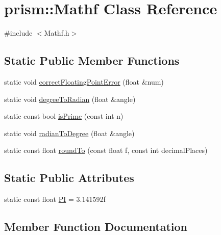 \hypertarget{classprism_1_1_mathf}{}\section{prism\+:\+:Mathf Class Reference}
\label{classprism_1_1_mathf}


{\ttfamily \#include $<$Mathf.\+h$>$}

\subsection*{Static Public Member Functions}
\begin{DoxyCompactItemize}
\item 
static void \hyperlink{classprism_1_1_mathf_ad97b3775f919367abc7ad8726ecd97d2}{correct\+Floating\+Point\+Error} (float \&num)
\item 
static void \hyperlink{classprism_1_1_mathf_ac72a5e8e138a66e62f191215468e394f}{degree\+To\+Radian} (float \&angle)
\item 
static const bool \hyperlink{classprism_1_1_mathf_a7546312788a409407af539770350f5e3}{is\+Prime} (const int n)
\item 
static void \hyperlink{classprism_1_1_mathf_aba90ed9091b83cca1567aee6c4acf13a}{radian\+To\+Degree} (float \&angle)
\item 
static const float \hyperlink{classprism_1_1_mathf_a6ab6c3867985cc8e0df9717ed0a00749}{round\+To} (const float f, const int decimal\+Places)
\end{DoxyCompactItemize}
\subsection*{Static Public Attributes}
\begin{DoxyCompactItemize}
\item 
static const float \hyperlink{classprism_1_1_mathf_a96de371e5c5fe1eb981b6045c3148f3e}{PI} = 3.\+141592f
\end{DoxyCompactItemize}


\subsection{Member Function Documentation}
